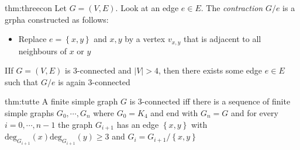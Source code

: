 \par\bigskip
\begin{theo}[Contraction]{thm:threecon}
  Let $G = (V,E)$. Look at an edge $e\in E$. The \textit{contraction} $G/e$ is a grpha constructed as follows:\par
  \begin{itemize}
    \item Replace $e = \left\{x,y\right\}$ and $x,y$ by a vertex $v_{x,y}$ that is adjacent to all neighbours of $x$ or $y$
  \end{itemize}
\end{theo}
\par\bigskip
\begin{lem}
  IIf $G = (V,E)$ is 3-connected and $\left|V\right|>4$, then there exists some edge $e\in E$ such that $G/e$ is again 3-connected
\end{lem}
\par\bigskip
\begin{theo}[Tutte]{thm:tutte}
  A finite simple graph $G$ is 3-connected iff there is a sequence of finite simple graphs $G_0,\cdots,G_n$ where $G_0 = K_4$ and end with $G_n = G$ and for every $i=0,\cdots,n-1$ the graph $G_{i+1}$ has an edge $\left\{x,y\right\}$ with $\text{deg}_{G_{i+1}}(x)\text{deg}_{G_{i+1}}(y)\geq3$ and $G_i = G_{i+1}/\left\{x,y\right\}$
\end{theo}
